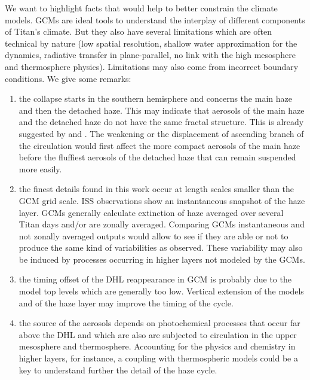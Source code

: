 We want to highlight facts that would help to better constrain the climate models.
GCMs are ideal tools to understand the interplay of different components of Titan's climate.
But they also have several limitations which are often technical by nature (low spatial resolution, shallow water
approximation for the dynamics, radiative transfer in plane-parallel, no link with the high mesosphere and thermosphere physics).
Limitations may also come from incorrect boundary conditions. We give some remarks:

\begin{enumerate}
\item the collapse starts in the southern hemisphere and concerns the main haze and then the detached haze. This
may indicate that aerosols of the main haze and the detached haze do not have the same fractal structure. This is
already suggested by \cite{Lavvas2009} and \cite{Larson2015}.
The weakening or the displacement of ascending branch of the circulation would first affect the more
compact aerosols of the main haze before the fluffiest aerosols of the detached haze that can remain suspended more
easily.
\item the finest details found in this work occur at length scales smaller than the GCM grid scale.
ISS observations show an instantaneous snapshot of the haze layer. GCMs generally
calculate extinction of haze averaged over several Titan days and/or are zonally averaged. Comparing GCMs instantaneous and
not zonally averaged outputs would allow to see if they are able or not to produce the same kind of variabilities as
observed. These variability may also be induced by processes occurring in higher layers not modeled by the GCMs.
\item the timing offset of the DHL reappearance in GCM is probably due to the model top levels which are generally too
low. Vertical extension of the models and of the haze layer may improve the timing of the cycle.
\item the source of the aerosols depends on photochemical processes that occur far above the DHL and which are
also are subjected to circulation in the upper mesosphere and thermosphere.
Accounting for the physics and chemistry in higher layers, for instance, a coupling with thermospheric models could
be a key to understand further the detail of the haze cycle.
\end{enumerate}
